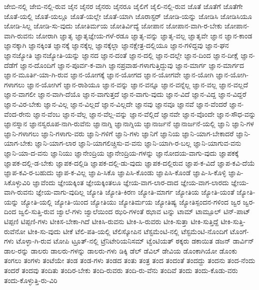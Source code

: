{ಜೇಬಿ-ನಲ್ಲಿ
ಜೇಬಿ-ನಲ್ಲಿ-ರುವ
ಜೈನ
ಜೈನರ
ಜೈನರು
ಜೈನರೂ
ಜೈಲಿಗೆ
ಜೈಲಿ-ನಲ್ಲಿ-ರುವ
ಜೊತೆ
ಜೊತೆಗೆ
ಜೊತೆಗೇ
ಜೊತೆ-ಯಲ್ಲಿ
ಜೊತೆ-ಯಲ್ಲೂ
ಜೊತೆ-ಯಲ್ಲೇ
ಜೊತೆ-ಯಾಗಿ
ಜೊರಾಸ್ಟರ್
ಜೋಡಿ-ಯನ್ನು
ಜೋಡಿಸಿ
ಜೋಡಿಸಿಯೂ
ಜೋಡಿ-ಸಿಲ್ಲ
ಜೋಡಿ-ಸು-ವುದು
ಜೋತಿರ್ಮಯ
ಜೋತಿರ್ವಿದ್ಯೆ
ಜೋಪಾನ
ಜೋಪಾನ-ವಾಗಿ-ರ-ಬೇಕು
ಜೋಪಾನ-ವಾಗಿ-ರುವನು
ಜೋರಾಗಿ
ಜ್ಞಾತೃ
ಜ್ಞಾತೃಜ್ಞೇಯ-ಗಳೆ-ರಡೂ
ಜ್ಞಾತೃ-ವನ್ನು
ಜ್ಞಾತೃ-ವಲ್ಲ
ಜ್ಞಾತೃವೇ
ಜ್ಞಾನ
ಜ್ಞಾನ-ಕಾಂಡ
ಜ್ಞಾನಕ್ಕಾಗಿ
ಜ್ಞಾನಕ್ಕಿಂತ
ಜ್ಞಾನಕ್ಕೆ
ಜ್ಞಾನಕ್ಕೆಲ್ಲ
ಜ್ಞಾನಕ್ಕೆಲ್ಲಾ
ಜ್ಞಾನಕ್ಷೇತ್ರ-ದಲ್ಲಿಯೂ
ಜ್ಞಾನ-ಗಳಿದ್ದವು
ಜ್ಞಾನ-ಘನ
ಜ್ಞಾನಜ್ಯೋತಿ
ಜ್ಞಾನಜ್ಯೋತಿ-ಯನ್ನು
ಜ್ಞಾನದ
ಜ್ಞಾನ-ದಂತೆ
ಜ್ಞಾನ-ದಲ್ಲಿ
ಜ್ಞಾನ-ದಲ್ಲೇ
ಜ್ಞಾನ-ದಿಂದ
ಜ್ಞಾನ-ದೀಕ್ಷೆ
ಜ್ಞಾನ-ದೆಡೆಗೆ
ಜ್ಞಾನ-ದೊಂದಿಗೆ
ಜ್ಞಾನ-ಪೂರ್ವ-ಕ-ವಾಗಿ
ಜ್ಞಾನಪ್ರವಾಹ-ಗಳಾಗುತ್ತಿದ್ದುವು
ಜ್ಞಾನ-ಮಾರ್ಗ
ಜ್ಞಾನ-ಮಾರ್ಗದ
ಜ್ಞಾನ-ಮೂರ್ತಿ-ಯಾ-ಗಿ-ರುವ
ಜ್ಞಾನ-ಯೋಗಕ್ಕೆ
ಜ್ಞಾನ-ಯೋಗದ
ಜ್ಞಾನ-ಯೋಗವೇ
ಜ್ಞಾನ-ಯೋಗಿ
ಜ್ಞಾನ-ಯೋಗಿ-ಗಳಾಗಲು
ಜ್ಞಾನ-ಯೋಗಿಗೆ
ಜ್ಞಾನ-ರಾಶಿಯೂ
ಜ್ಞಾನ-ವನ್ನು
ಜ್ಞಾನ-ವನ್ನೂ
ಜ್ಞಾನ-ವನ್ನೆಲ್ಲ
ಜ್ಞಾನ-ವಲ್ಲ
ಜ್ಞಾನ-ವಲ್ಲದೆ
ಜ್ಞಾನ-ವಾಗಲೀ
ಜ್ಞಾನ-ವಾಗಿ-ದೆಯೊ
ಜ್ಞಾನ-ವಾಗುತ್ತದೆ
ಜ್ಞಾನ-ವಾಗು-ವುದು
ಜ್ಞಾನ-ವಿದೆ
ಜ್ಞಾನ-ವಿದ್ದ
ಜ್ಞಾನ-ವಿದ್ದರೆ
ಜ್ಞಾನ-ವಿರ-ಬೇಕು
ಜ್ಞಾನ-ವಿಲ್ಲ
ಜ್ಞಾನ-ವಿಲ್ಲದೆ
ಜ್ಞಾನ-ವಿಲ್ಲದೇ
ಜ್ಞಾನವು
ಜ್ಞಾನವೂ
ಜ್ಞಾನವೆ
ಜ್ಞಾನ-ವೆಂದರೆ
ಜ್ಞಾನ-ವೆಂದ-ರೇನು
ಜ್ಞಾನ-ವೆಂಬ
ಜ್ಞಾನ-ವೆಲ್ಲ
ಜ್ಞಾನ-ವೆಲ್ಲ-ವನ್ನು
ಜ್ಞಾನ-ವೆಲ್ಲಿದೆ
ಜ್ಞಾನವೇ
ಜ್ಞಾನ-ವೊಂದೇ
ಜ್ಞಾನ-ಸೌಧ-ವನ್ನು
ಜ್ಞಾನಸ್ನಾನ
ಜ್ಞಾನಸ್ವರೂಪ-ನಾಗಿ-ರುವೆನು
ಜ್ಞಾನಾಗ್ನಿ
ಜ್ಞಾನಾಗ್ನಿಯ
ಜ್ಞಾನಾರ್ಜನೆ
ಜ್ಞಾನಾರ್ಜನೆ-ಯಲ್ಲಿ
ಜ್ಞಾನಿ
ಜ್ಞಾನಿ-ಗಳ
ಜ್ಞಾನಿ-ಗಳಾಗಲು
ಜ್ಞಾನಿ-ಗಳಾಗು-ವರು
ಜ್ಞಾನಿ-ಗಳಿಗೆ
ಜ್ಞಾನಿ-ಗಳು
ಜ್ಞಾನಿಗೆ
ಜ್ಞಾನಿಯ
ಜ್ಞಾನಿ-ಯಾಗ-ಬೇಕಾದರೆ
ಜ್ಞಾನಿ-ಯಾಗ-ಬೇಕು
ಜ್ಞಾನಿ-ಯಾಗ-ಲಾರ
ಜ್ಞಾನಿ-ಯಾಗಲಿಚ್ಚಿಸು-ವ-ವನು
ಜ್ಞಾನಿ-ಯಾಗಿ-ರ-ಬಲ್ಲ
ಜ್ಞಾನಿ-ಯಾಗುವ-ವನು
ಜ್ಞಾನಿ-ಯಾ-ದ-ವನು
ಜ್ಞಾನಿಯು
ಜ್ಞಾನೇಂದ್ರಿಯ
ಜ್ಞಾನೇಂದ್ರಿಯ-ಗಳನ್ನು
ಜ್ಞಾನೋದಯ-ವಾಗು-ವುದು
ಜ್ಞಾಪಕಕ್ಕೆ
ಜ್ಞಾಪಕ-ದಲ್ಲಿ-ಡ-ಬೇಕು
ಜ್ಞಾಪಕ-ದಲ್ಲಿಡಿ
ಜ್ಞಾಪಕ-ದಲ್ಲಿ-ಡು-ವುದು
ಜ್ಞಾಪಕ-ದಲ್ಲಿರುವ
ಜ್ಞಾಪ-ಕ-ವಿದೆ
ಜ್ಞಾಪ-ಕವಿ-ದೆಯೆ
ಜ್ಞಾಪ-ಕವಿ-ರ-ಬಹುದು
ಜ್ಞಾಪ-ಕ-ವಿಲ್ಲ
ಜ್ಞಾಪಿ-ಸಿಕೊ
ಜ್ಞಾಪಿಸಿ-ಕೊಂಡು
ಜ್ಞಾಪಿಸಿ-ಕೊಂಡೆ
ಜ್ಞಾಪಿ-ಸಿ-ಕೊಳ್ಳಿ
ಜ್ಞಾಪಿ-ಸಿಕೊಳ್ಳುವಿರಿ
ಜ್ಞಾವೆಂದು
ಜ್ಞೇಯಕ್ಕಿಂತ
ಜ್ಞೇಯಕ್ಕಿಂತಲೂ
ಜ್ಞೇಯ-ವಾಗ-ಲಾರ-ದಾದ
ಜ್ಞೇಯ-ವಾಗ-ಲಾರದು
ಜ್ಞೇಯ-ವಾಗಿ-ರುವನು
ಜ್ಞೇಯ-ವಾಗು-ವುದಿಲ್ಲ
ಜ್ಯೋತಿ
ಜ್ಯೋತಿ-ಕಿರಣ
ಜ್ಯೋತಿ-ಮಾರ್ಗ
ಜ್ಯೋತಿಯ
ಜ್ಯೋತಿ-ಯಂತೆ
ಜ್ಯೋತಿ-ಯನ್ನು
ಜ್ಯೋತಿ-ಯಲ್ಲಿ
ಜ್ಯೋತಿ-ಯಿಂದ
ಜ್ಯೋತಿಯು
ಜ್ಯೋತಿರ್ಮಯ
ಜ್ಯೋತಿಷ್ಯ
ಜ್ಯೋತಿಸ್ಪಂದನ-ಗಳಿಂದ
ಜ್ವರ
ಜ್ವರ-ದಿಂದ
ಜ್ವಲಿ-ಸುತ್ತಿ-ರುವ
ಜ್ವಾಲೆ-ಗಳು
ಜ್ವಾಲೆಯಿಂದ
ಝರಿ-ಗಳಂತೆ
ಝಾವ
ಟನ್ನು
ಟಾಮ್
ಟಾಮ್ಪೂಲ್
ಟಿನ್-ಪಾಟ್
ಟಿಪ್ಪಣಿ
ಟಿಪ್ಪಣಿ-ಗಳು
ಟೀಕಿಸ-ಬೇಕಾ-ಗಿದೆ
ಟೀಕಿಸಿ-ರುವನು
ಟೀಕಿ-ಸಿ-ರುವರು
ಟೀಕಿ-ಸುತ್ತಾ
ಟೀಕಿ-ಸುತ್ತಿದ್ದೆ
ಟೀಕಿ-ಸುತ್ತಿ-ರುವೆನೋ
ಟೀಕಿ-ಸು-ವುದು
ಟೀಕೆ
ಟೆಲಿ-ಪತಿ-ಯಲ್ಲಿ
ಟೆಲಿಸ್ಕೋಪಿನ
ಟೆಸ್ಟಮೆಂಟಿ-ನಲ್ಲಿ
ಟೆಸ್ಟಮೆಂಟಿ-ನೊಂದಿಗೆ
ಟೊಂಗೆ-ಗಳು
ಟೊಳ್ಳಾ-ಗಿ-ರುವ
ಟೋಪಿ
ಟ್ರೂತ್-ನಲ್ಲಿ
ಟ್ರೆನಿಟೇರಿಯನಿಸಮ್
ಟ್ವೆಂಟಿಯತ್
ಠಕ್ಕರು
ಡಕಾಯಿತ
ಡಜನ್
ಡಾರ್ವಿನ್
ಡಾಲ-ರನ್ನು
ಡಾಲರು
ಡಾಲರು-ಗಳನ್ನು
ಡಾಲರು-ಗಳು
ಡಿಕ್ಕಿ
ಡೆಲ್
ಡೆವಿಲ್
ಡೇವಿಯ
ಡೊಂಕಾಗಿಯೋ
ಡೊಂಕು
ತಂಗಲು
ತಂಗಳು
ತಂಟೆಯೇ
ತಂಡ
ತಂಡ-ಗಳು
ತಂಡದ
ತಂತು
ತಂತ್ರ
ತಂದ
ತಂದಂತೆ
ತಂದದ್ದು
ತಂದನು
ತಂದ-ನೆಂದು
ತಂದರೆ
ತಂದವು
ತಂದಿತು
ತಂದಿರ-ಬೇಕು
ತಂದಿ-ರುವರು
ತಂದಿ-ರು-ವೆನು
ತಂದಿವೆ
ತಂದು
ತಂದು-ಕೊಡು-ವರು
ತಂದು-ಕೊಳ್ಳುತ್ತಿ-ರು-ವಿರಿ
}
